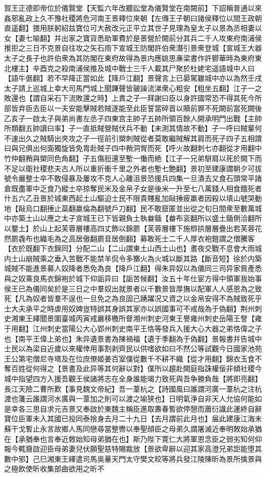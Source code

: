 賀王正德即帝位於儀賢堂【天監六年改聽訟堂為儀賢堂在南闕前】下詔稱普通以來姦邪亂政上久不豫社稷將危河南王景釋位來朝【左傳王子朝曰諸侯釋位以間王政朝直遥翻】猥用朕躬紹兹寶位可大赦改元正平立其世子見理為皇太子以景為丞相妻以女【妻七喻翻】并出家之寶貨悉助軍費於是景營於闕前分其兵二千人攻東府南浦侯推拒之三日不克景自往攻之矢石雨下宣城王防閣許伯衆潛引景衆登城【宣城王大器太子之長子也許伯衆為其防閣在東府故得為景内應姚思亷梁書作許鬰華時為東府東北樓主】辛酉克之殺南浦侯推及城中戰士三千人載其尸聚於杜姥宅遥語城中人曰【語牛倨翻】若不早降正當如此【降戶江翻】景聲言上已晏駕雖城中亦以為然壬戌太子請上巡城上幸大司馬門城上聞蹕聲皆皷譟流涕衆心粗安【粗坐五翻】江子一之敗還也【謂自采石下流敗還之時】上責之子一拜謝曰臣以身許國常恐不得其死今所部皆弃臣去臣以一夫安能擊賊若賊遂能至此臣誓當碎首以贖前罪不死闕前當死闕後乙亥子一啟太子與弟尚書左丞子四東宫主帥子五帥所領百餘人開承明門出戰【主帥所類翻五帥讀曰率】子一直抵賊營賊伏兵不動【未測其情故不動】子一呼曰賊輩何不速出久之賊騎出夾攻之子一徑前引槊刺賊從者莫敢繼賊解其肩而死子四子五相謂曰與兄俱出何面獨旋皆免胄赴賊子四中矟洞胷而死【呼火故翻刺七亦翻從才用翻中竹仲翻矟與槊同色角翻】子五傷脰還至塹一慟而絶【江子一兄弟駢肩以死於闕下而不足以衛社稷悲夫古人所以重折衝千里之外者也塹七艶翻】景初至建康謂朝夕可拔號令嚴整士卒不敢侵暴及屢攻不克人心離沮景恐援兵四集一旦潰去又食石頭常平諸倉既盡軍中乏食乃縱士卒掠奪民米及金帛子女是後米一升至七八萬錢人相食餓死者什五六乙丑景於城東西起土山驅迫士民不限貴賤亂加敺捶疲羸者因殺以填山號哭動地【敺烏口翻捶止蘂翻羸倫為翻號戶刀翻】民不敢竄匿並出從之旬日間衆至數萬城中亦築土山以應之太子宣城王已下皆親負土執畚鍤【畚布衮翻所以盛土鍤側洽翻所以鍪土】於山上起芙蓉層樓高四丈飾以錦罽【芙蓉層樓下施㭿拱層層疊出若芙蓉花然罽毳布也織毛為之高居傲翻罽音居倒翻】募敢死士二千人厚衣袍鎧謂之僧騰客【衣於既翻下衣錦同】分配二山【二山謂東土山西土山也】晝夜交戰不息會大雨城内土山崩賊乘之垂入苦戰不能禁羊侃令多擲火為火城以斷其路【斷音短】徐於内築城賊不能進景募人奴降者悉免為良【降戶江翻】得朱异奴以為儀同三司异家貲產悉與之奴乘良馬衣錦袍於城下仰詬异曰【詬苦候翻】汝五十年仕宦方得中領軍我始事侯王已為儀同矣於是三日之中羣奴出就景者以千數景皆厚撫以配軍人人感恩為之致死【凡為奴者皆羣不逞也一旦免之為良固己踴躍况又資之以金帛安得不為賊致死乎士大夫承平之時虐用奴婢豈特誤其身誤其家亦以誤國事可不戒哉為于偽翻】荆州刺史湘東王繹聞景圍臺城丙寅戒嚴移檄所督湘州刺史河東王譽雍州刺史岳陽王詧【雍于用翻】江州刺史當陽公大心郢州刺史南平王恪等發兵入援大心大器之弟恪偉之子也【南平王偉上弟也】朱异遺景書為陳禍福【遺于季翻為于偽翻】景報書并告城中士民以為梁自近歲以來權倖用事割剥齊民以供嗜欲如曰不然公等試觀今日國家池苑王公第宅僧尼寺塔及在位庶僚姬姜百室僕從數千不耕不織【從才用翻】錦衣玉食不奪百姓從何得之【景書及此异等其何辭以對】僕所以趨赴闕庭指誅權佞非傾社稷今城中指望四方入援吾觀王侯諸將志在全身誰能竭力致死與吾争勝負哉【將即亮翻】長江天險二曹所歎【事見魏文帝紀】吾一葦杭之【詩國風曰誰謂河廣一葦杭之注杭渡也箋云誰謂河水廣與一葦加之則可以渡之喻狭也】日明氣浄自非天人允協何能如是幸各三思自求元吉景又奉啟於東魏主稱臣進取夀春暫欲停憩而蕭衍識此運終自辭寶位臣軍未入其國已投同泰捨身去月二十九日【去月謂前此月也】届此建康江海未蘇干戈暫止永言故鄉人馬同戀尋當整轡以奉聖顔臣之母弟久謂屠滅近奉明敇始承猶在【承猶奉也言奉近敇始知母弟猶在也】斯乃陛下寛仁大將軍恩念臣之弱劣知何仰報今輒齎啟迎臣母弟妻兒伏願聖慈特賜裁放【景欲卑辭以迎其家高澄兄弟詎能堕其數中邪】己巳湘東王繹遣司馬吳曅天門太守樊文皎等將兵發江陵陳昕為景所擒景與之極飲使昕收集部曲欲用之昕不